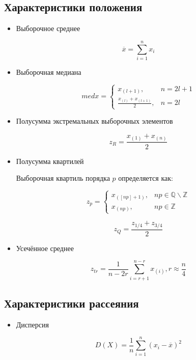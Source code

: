 \subsection{Характеристики положения}
\begin{itemize}
	\item Выборочное среднее
	
	\begin{equation}\label{mean}
		\overline{x}=\displaystyle \sum_{i=1}^{n} {x_i}
	\end{equation}
	
	\item Выборочная медиана
	
	\begin{equation}\label{med}
		med x =
		\begin{cases}
		x_{(l+1)}, & n=2l + 1 \\
		\frac{x_{(l)}+x_{(l+1)}}{2}, & n=2l
		\end{cases}
	\end{equation}

	\item Полусумма экстремальных выборочных элементов

	\begin{equation}\label{zr}	
		z_R =\frac{x_{(1)}+x_{(n)}}{2}
	\end{equation}
	
	\item Полусумма квартилей
	
	Выборочная квартиль порядка $p$ определяется как:
	
	$$z_p =
	\begin{cases}
	x_{([np]+1)}, & np \in \mathbb{Q} \backslash \mathbb{Z} \\
	x_{(np)}, & np \in \mathbb{Z}
	\end{cases}
	$$
	
	\begin{equation}\label{zq}
		z_Q =\frac{z_{1/4}+z_{3/4}}{2}
	\end{equation}
	
	\item Усечённое среднее
	
	\begin{equation}\label{tr_mean}
		z_{tr}=\frac{1}{n-2r}\displaystyle \sum_{i=r+1}^{n-r} x_{(i)}, r \approx \frac{n}{4}
	\end{equation}
\end{itemize}

\subsection{Характеристики рассеяния}
\begin{itemize}
	\item Дисперсия
	
	\begin{equation}\label{disp}
		D(X)=\frac{1}{n}\displaystyle \sum_{i=1}^{n}(x_i-\overline{x})^2
	\end{equation}
	
\end{itemize}
